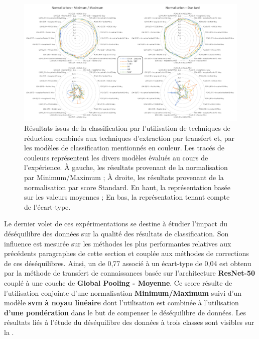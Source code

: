 \begin{landscape}
    \begin{figure}[H]
        \centering
        \includegraphics[width=0.95\linewidth]{contents/chapter_5/resources/results_image_classification_reduction.pdf}
        \caption{Résultats issus de la classification par l'utilisation de techniques de réduction combinés aux techniques d'extraction par transfert et, par les modèles de classification mentionnés en couleur. Les tracés de couleurs représentent les divers modèles évalués au cours de l'expérience. À gauche, les résultats provenant de la normalisation par Minimum/Maximum ; À droite, les résultats provenant de la normalisation par score Standard. En haut, la représentation basée sur les valeurs moyennes ; En bas, la représentation tenant compte de l'écart-type.}
        \label{fig:results_image_classification_reduction}
    \end{figure}
\end{landscape}

Le dernier volet de ces expérimentations se destine à étudier l'impact du déséquilibre des données sur la qualité des résultats de classification. Son influence est mesurée sur les méthodes les plus performantes relatives aux précédents paragraphes de cette section et couplée aux méthodes de corrections de ces déséquilibres. Ainsi, un \fscore{} de 0,77 associé à un écart-type de 0,04 est obtenu par la méthode de transfert de connaissances basée sur l'architecture \textbf{ResNet-50} couplé à une couche de \textbf{Global Pooling - Moyenne}. Ce score résulte de l'utilisation conjointe d'une normalisation \textbf{Minimum/Maximum} suivi d'un modèle \textbf{\gls{svm} à noyau linéaire} dont l'utilisation est combinée à l'utilisation \textbf{d'une pondération} dans le but de compenser le déséquilibre de données. Les résultats liés à l'étude du déséquilibre des données à trois classes sont visibles sur la .\par

